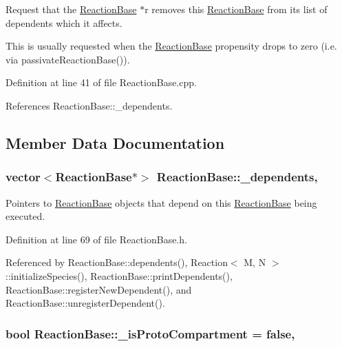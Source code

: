 Request that the \hyperlink{classReactionBase}{Reaction\+Base} $\ast$r removes this \hyperlink{classReactionBase}{Reaction\+Base} from its list of dependents which it affects. 

This is usually requested when the \hyperlink{classReactionBase}{Reaction\+Base} propensity drops to zero (i.\+e. via passivate\+Reaction\+Base()). 

Definition at line 41 of file Reaction\+Base.\+cpp.



References Reaction\+Base\+::\+\_\+dependents.



\subsection{Member Data Documentation}
\hypertarget{classReactionBase_a085e916b6291ef7da5004810c8b58c28}{
\subsubsection[{\+\_\+dependents}]{\setlength{\rightskip}{0pt plus 5cm}vector$<${\bf Reaction\+Base}$\ast$$>$ Reaction\+Base\+::\+\_\+dependents\hspace{0.3cm}{\ttfamily [protected]}, {\ttfamily [inherited]}}}\label{classReactionBase_a085e916b6291ef7da5004810c8b58c28}


Pointers to \hyperlink{classReactionBase}{Reaction\+Base} objects that depend on this \hyperlink{classReactionBase}{Reaction\+Base} being executed. 



Definition at line 69 of file Reaction\+Base.\+h.



Referenced by Reaction\+Base\+::dependents(), Reaction$<$ M, N $>$\+::initialize\+Species(), Reaction\+Base\+::print\+Dependents(), Reaction\+Base\+::register\+New\+Dependent(), and Reaction\+Base\+::unregister\+Dependent().

\hypertarget{classReactionBase_adf06f0937df570e381fb8db4312d81c6}{
\subsubsection[{\+\_\+is\+Proto\+Compartment}]{\setlength{\rightskip}{0pt plus 5cm}bool Reaction\+Base\+::\+\_\+is\+Proto\+Compartment = false\hspace{0.3cm}{\ttfamily [protected]}, {\ttfamily [inherited]}}}\label{classReactionBase_adf06f0937df570e381fb8db4312d81c6}


